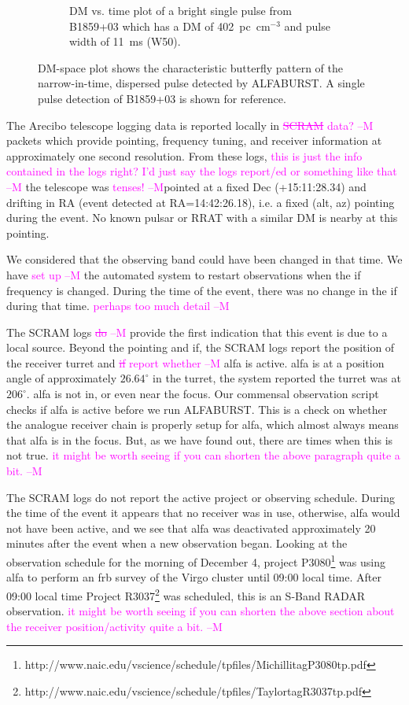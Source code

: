 \documentclass[a4paper,fleqn,usenatbib]{mnras}
\newcommand{\cM}[1]{\textcolor{magenta}{ #1 --M}}
\begin{document}
\begin{figure}
\begin{subfigure}[t]{0.5\textwidth}
        \caption{DM vs. time plot of a bright single pulse from B1859+03 which
        has a DM of 402~pc~cm$^{-3}$ and pulse width of 11~ms (W50).
        }
        \label{fig:dm_time_B1859}
    \end{subfigure}
    \caption{DM-space plot shows the characteristic butterfly pattern of the
    narrow-in-time, dispersed pulse detected by ALFABURST. A single pulse
    detection of B1859+03 is shown for reference.
    }
    \label{fig:dm_time}
\end{figure}

The Arecibo telescope logging data is reported locally in \cM{\sout{SCRAM} data?} packets which
provide pointing, frequency tuning, and receiver information at approximately
one second resolution. From these logs, \cM{this is just the info contained in the logs right? I'd just say the logs report/ed or something like that} the telescope was \cM{tenses!}pointed at a fixed Dec
(+15:11:28.34) and drifting in RA (event detected at RA=14:42:26.18), i.e. a
fixed (alt, az) pointing during the event. No known pulsar or RRAT with a similar
DM is nearby at this pointing.

We considered that the observing band could have been changed in that time.  We
have \cM{set up} the automated system to restart observations when the \gls{if}
frequency is changed.  During the time of the event, there was no change in the
\gls{if} during that time. \cM{perhaps too much detail}

The SCRAM logs \cM{\sout{do}} provide the first indication that this event is due to a local
source. Beyond the pointing and \gls{if}, the SCRAM logs report the position of
the receiver turret and \cM{\sout{if} report whether} \gls{alfa} is active. \gls{alfa} is at a position
angle of approximately $26.64^{\circ}$ in the turret, the system reported the
turret was at $206^{\circ}$. \gls{alfa} is not in, or even near the focus.  Our
commensal observation script checks if \gls{alfa} is active before we run
ALFABURST. This is a check on whether the analogue receiver chain is properly
setup for \gls{alfa}, which almost always means that \gls{alfa} is in the focus.
But, as we have found out, there are times when this is not true. \cM{it might be worth seeing if you can shorten the above paragraph quite a bit.}

The SCRAM logs do not report the active project or observing schedule. During
the time of the event it appears that no receiver was in use, otherwise,
\gls{alfa} would not have been active, and we see that \gls{alfa} was
deactivated approximately 20 minutes after the event when a new observation
began.  Looking at the observation schedule for the morning of December 4,
project
P3080\footnote{http://www.naic.edu/vscience/schedule/tpfiles/MichillitagP3080tp.pdf}
was using \gls{alfa} to perform an \gls{frb} survey of the Virgo cluster until
09:00 local time.  After 09:00 local time Project
R3037\footnote{http://www.naic.edu/vscience/schedule/tpfiles/TaylortagR3037tp.pdf}
was scheduled, this is an S-Band RADAR observation. \cM{it might be worth seeing if you can shorten the above section about the receiver position/activity quite a bit.}
\end{document}
